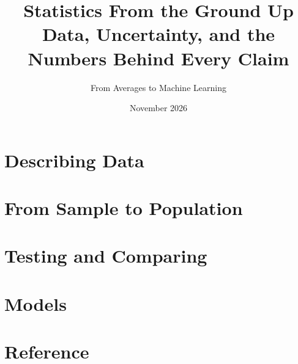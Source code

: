\documentclass[11pt]{book}
\title{\textbf{Statistics From the Ground Up}\\[0.4em]\large Data, Uncertainty, and the Numbers Behind Every Claim}
\author{From Averages to Machine Learning}
\date{November 2026}
\begin{document}
\frontmatter
\maketitle

\tableofcontents

\mainmatter

\part{Describing Data}





\part{From Sample to Population}





\part{Testing and Comparing}




\part{Models}





\part{Reference}

\end{document}
